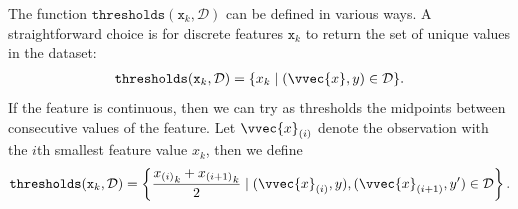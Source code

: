 \documentclass[letterpaper,10pt,english]{jupyterBook}
\begin{document}
\sphinxAtStartPar
The function \(\mathtt{thresholds}(\mathtt{x}_k,\mathcal{D})\) can be defined in various ways. A straightforward choice is for discrete features \(\mathtt{x}_k\) to return the set of unique values in the dataset:
\begin{equation*}
\begin{split}\mathtt{thresholds}(\mathtt{x}_k,\mathcal{D}) = \{x_k\mid (\vvec{x},y)\in\mathcal{D}\}.\end{split}
\end{equation*}
If the feature is continuous, then we can try as thresholds the midpoints between consecutive values of the feature. Let \(\vvec{x}_{(i)}\) denote the observation with the \(i\)\sphinxhyphen{}th smallest feature value \(x_k\), then we define
\begin{equation*}
\begin{split}\mathtt{thresholds}(\mathtt{x}_k,\mathcal{D}) = \left\{\frac{{x_{(i)}}_k + {x_{(i+1)}}_k}{2}\mid (\vvec{x}_{(i)},y),(\vvec{x}_{(i+1)},y')\in\mathcal{D}\right\}.\end{split}
\end{equation*}
\end{document}
